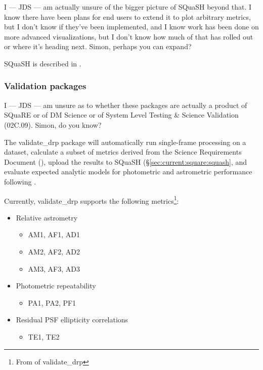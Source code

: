 \documentclass[DM,authoryear,toc,lsstdraft]{lsstdoc}
\begin{document}
\begin{draftnote}
I --- JDS --- am actually unsure of the bigger picture of SQuaSH beyond that.
I know there have been plans for end users to extend it to plot arbitrary
metrics, but I don't know if they've been implemented, and I know work has
been done on more advanced visualizations, but I don't know how much of that
has rolled out or where it's heading next. Simon, perhaps you can expand?
\end{draftnote}

SQuaSH is described in .

\subsubsection{Validation packages}
\label{sec:current:square:validate}

\begin{draftnote}
I --- JDS --- am unsure as to whether these packages are actually a product of
SQuaRE or of DM Science or of System Level Testing \& Science Validation
(02C.09). Simon, do you know?
\end{draftnote}

The validate\_drp package will automatically run single-frame processing on a
dataset, calculate a subset of metrics derived from the Science Requirements
Document (), upload the results to SQuaSH
(\S\ref{sec:current:square:squash}, and evaluate expected analytic models for
photometric and astrometric performance following \cite{2008arXiv0805.2366I}.

Currently, validate\_drp supports the following metrics\footnote{From
 of validate\_drp }:

\begin{itemize}
\item{Relative astrometry
  \begin{itemize}
    \item{AM1, AF1, AD1}
    \item{AM2, AF2, AD2}
    \item{AM3, AF3, AD3}
  \end{itemize}
}
\item{Photometric repeatability
  \begin{itemize}
    \item{PA1, PA2, PF1}
  \end{itemize}
}
\item{Residual PSF ellipticity correlations
  \begin{itemize}
    \item{TE1, TE2}
  \end{itemize}
}
\end{itemize}
\end{document}
